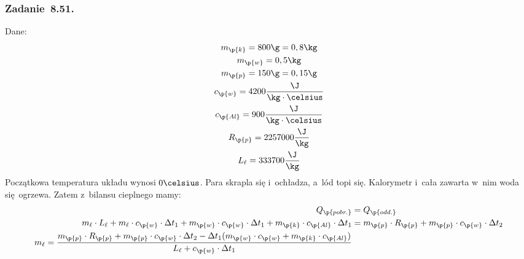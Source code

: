 \subsubsection*{Zadanie~8.51.}
Dane:
\begin{gather*}
    m_\p{k} = 800\g = 0,8\kg\\
    m_\p{w} = 0,5\kg\\
    m_\p{p} = 150\g = 0,15\g\\
    c_\p{w} = 4200\frac{\J}{\kg \cdot \celsius}\\
    c_\p{Al} = 900\frac{\J}{\kg \cdot \celsius}\\
    R_\p{p} = 2257000\frac{\J}{\kg}\\
    L_\ell = 333700\frac{\J}{\kg}
\end{gather*}
Początkowa temperatura układu wynosi \(0\celsius\). Para skrapla się i~ochładza, a~lód topi się. Kalorymetr i~cała zawarta w~nim woda się ogrzewa. Zatem z~bilansu cieplnego mamy:
\begin{align*}
    Q_\p{pobr.} &= Q_\p{odd.}\\
    m_\ell \cdot L_\ell + m_\ell \cdot c_\p{w} \cdot \Delta t_1 + m_\p{w} \cdot c_\p{w} \cdot \Delta t_1 + m_\p{k} \cdot c_\p{Al} \cdot \Delta t_1
        &= m_\p{p} \cdot R_\p{p} + m_\p{p} \cdot c_\p{w} \cdot \Delta t_2\\
    m_\ell = \frac{m_\p{p} \cdot R_\p{p} + m_\p{p} \cdot c_\p{w} \cdot \Delta t_2 - \Delta t_1 (m_\p{w} \cdot c_\p{w} + m_\p{k} \cdot c_\p{Al})}{L_\ell + c_\p{w} \cdot \Delta t_1}&
\end{align*}
